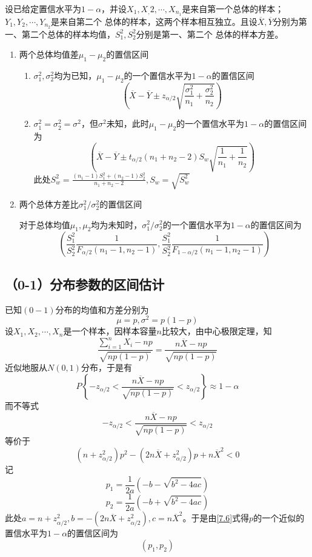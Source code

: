 \begin{theorem}
    设已给定置信水平为$1-\alpha$，并设$X_1,X_,2,\cdots,X_{n_1}$是来自第一个总体的样本；$Y_1,Y_2,\cdots,Y_{n_2}$是来自第二个
    总体的样本，这两个样本相互独立。且设$\overline{X},\overline{Y}$分别为第一、第二个总体的样本均值，$S_1^2,S_2^2$分别是第一、第二个
    总体的样本方差。
    \begin{enumerate}[1.]
        \item 两个总体均值差$\mu_1-\mu_2$的置信区间
        \begin{enumerate}[(1)]
            \item $\sigma_1^2,\sigma_2^2$均为已知，$\mu_1-\mu_2$的一个置信水平为$1-\alpha$的置信区间$$\left(\overline{X}-\overline{Y}\pm z_{\alpha/2}\sqrt{\frac{\sigma_1^2}{n_1}+\frac{\sigma^2_2}{n_2}}\right)$$
            \item $\sigma_1^2=\sigma_2^2=\sigma^2$，但$\sigma^2$未知，此时$\mu_1-\mu_2$的一个置信水平为$1-\alpha$的置信区间为
            $$\left(\overline{X}-\overline{Y}\pm t_{\alpha/2}(n_1+n_2-2)S_w\sqrt{\frac{1}{n_1}+\frac{1}{n_2}}\right)$$
            此处$\displaystyle{S_w^2=\frac{(n_1-1)S_1^2+(n_2-1)S_2^2}{n_1+n_2-2},S_w=\sqrt{S_w^2}}$
        \end{enumerate}
        \item 两个总体方差比$\sigma_1^2/\sigma_2^2$的置信区间
        
        对于总体均值$\mu_1,\mu_2$均为未知时，$\sigma_1^2/\sigma_2^2$的一个置信水平为$1-\alpha$的置信区间为
        $$\left(\frac{S_1^2}{S_2^2}\frac{1}{F_{\alpha/2}(n_1-1,n_2-1)},\frac{S_1^2}{S_2^2}\frac{1}{F_{1-\alpha/2}(n_1-1,n_2-1)}\right)$$
    \end{enumerate} 
\end{theorem}

\subsection{（0-1）分布参数的区间估计}
    \begin{theorem}
        已知$(0-1)$分布的均值和方差分别为$$\mu=p,\sigma^2=p(1-p)$$
        设$X_1,X_2,\cdots,X_n$是一个样本，因样本容量$n$比较大，由中心极限定理，知
        $$\frac{\sum\limits_{i=1}^n X_i-np}{\sqrt{np(1-p)}}=\frac{n\overline{X}-np}{\sqrt{np(1-p)}}$$
        近似地服从$N(0,1)$分布，于是有
        $$P\left\{-z_{\alpha/2}<\frac{n\overline{X}-np}{\sqrt{np(1-p)}}<z_{\alpha/2}\right\}\approx 1-\alpha$$
        而不等式
        \begin{equation}\tag{4}\label{7.6}
            -z_{\alpha/2}<\frac{n\overline{X}-np}{\sqrt{np(1-p)}}<z_{\alpha/2}
        \end{equation}
        等价于
        $$(n+z^2_{\alpha/2})p^2-(2n\overline{X}+z^2_{\alpha/2})p+n\overline{X}^2<0$$
        记$$p_1=\frac{1}{2a}(-b-\sqrt{b^2-4ac})$$
        $$p_2=\frac{1}{2a}(-b+\sqrt{b^2-4ac})$$
        此处$a=n+z^2_{\alpha/2},b=-(2n\overline{X}+z^2_{\alpha/2}),c=n\overline{X}^2$。于是由\eqref{7.6}式得$p$的一个近似的置信水平为$1-\alpha$的置信区间为
        $$(p_1,p_2)$$
    \end{theorem}
 
